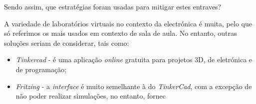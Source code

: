 Sendo assim, que estratégias foram usadas para mitigar estes entraves?


A variedade de laboratórios virtuais no contexto da electrónica é muita, pelo que só referimos os mais usados em contexto de sala de aula. No entanto, outras soluções seriam de considerar, tais como:
\begin{itemize}
    \item \textit{Tinkercad} - é uma aplicação \textit{online} gratuita para projetos 3D, de eletrónica e de programação;
    \item \textit{Fritzing} - a \textit{interface} é muito semelhante à do \textit{TinkerCad}, com a excepção de não poder realizar simulações, no entanto, fornec
\end{itemize}